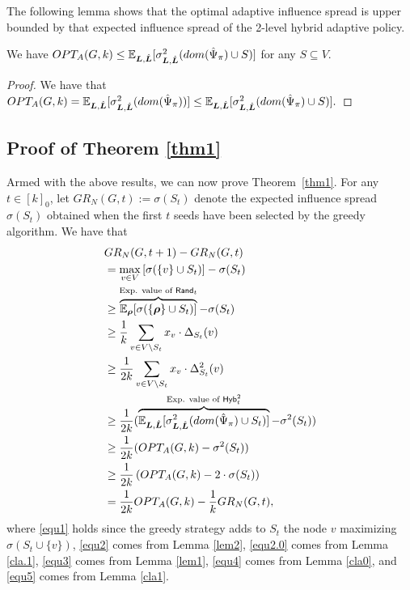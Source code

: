 The following lemma shows that the optimal adaptive influence spread is upper bounded by that expected influence spread of the 2-level hybrid adaptive policy. 
\begin{lemma}\label{cla0}
We have $OPT_A(G,k)\leq \mathbb{E}_{\bm L,\hat{\bm L}}[\sigma^2_{\bm L,\hat{\bm L}}(dom(\hat{\Psi}_{\pi})\cup S)]$ for any $S\subseteq V$. 
\end{lemma}

\begin{proof}
We have that $OPT_A(G,k)=\mathbb{E}_{\bm L,\hat{\bm L}}[\sigma^2_{\bm L,\hat{\bm L}}(dom(\hat{\Psi}_{\pi}))]\leq \mathbb{E}_{\bm L,\hat{\bm L}}[\sigma^2_{\bm L,\hat{\bm L}}(dom(\hat{\Psi}_{\pi})\cup S)].$
\end{proof}

\subsection{Proof of Theorem \ref{thm1}}\label{proofthm1}
Armed with the above results, we can now prove Theorem~\ref{thm1}. For any $t\in [k]_0$, let $GR_N(G,t):=\sigma(S_t)$ denote the expected influence spread $\sigma(S_t)$ obtained when the first $t$ seeds have been selected by the greedy algorithm. We have that 
\begin{align}
&GR_N(G,t+1)-GR_N(G,t)\nonumber\\
&=\max_{v\in V}\left[\sigma(\{v\}\cup S_{t})\right]-\sigma(S_{t})\nonumber\\
&\geq \overbrace{\mathbb{E}_{\bm \rho}[\sigma(\{\bm \rho\}\cup S_{t})]}^{\text{Exp. value of }{\sf Rand}_t}-\sigma(S_{t})\label{equ1}\\
&\geq \frac{1}{k}\sum_{v\in V\setminus S_{t}}x_v\cdot \Delta_{S_t}(v)\label{equ2}\\
&\geq \frac{1}{2k}\sum_{v\in V\setminus S_t}x_v\cdot  \Delta^2_{S_t}(v)\label{equ2.0}\\
&\geq \frac{1}{2k} (\overbrace{\mathbb{E}_{\bm L,\hat{\bm L}}[\sigma^2_{\bm L,\hat{\bm L}}(dom(\hat{\Psi}_{\pi})\cup S_t)]}^{\text{Exp. value of ${\sf Hyb}^2_t$}}-\sigma^2(S_t))\label{equ3}\\
&\geq \frac{1}{2k} (OPT_A(G,k)-\sigma^2(S_t))\label{equ4}\\
&\geq \frac{1}{2k}\left(OPT_A(G,k)-2\cdot \sigma(S_t)\right)\label{equ5}\\
&=\frac{1}{2k}OPT_A(G,k)-\frac{1}{k}GR_N(G,t),\label{equfund}
\end{align}
where \eqref{equ1} holds since the greedy strategy adds to $S_t$ the node $v$ maximizing $\sigma(S_t\cup\{v\})$, \eqref{equ2} comes from Lemma \ref{lem2}, \eqref{equ2.0} comes from Lemma \ref{cla.1}, \eqref{equ3} comes from Lemma \ref{lem1}, \eqref{equ4} comes from Lemma \ref{cla0}, and  \eqref{equ5} comes from Lemma \ref{cla1}.
